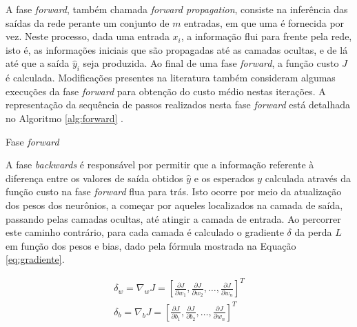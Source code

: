 A fase \emph{forward}, também chamada \emph{forward propagation}, consiste na inferência das saídas da rede perante um conjunto de $m$ entradas, em que uma é fornecida por vez. Neste processo, dada uma entrada $x_i$, a informação flui para frente  pela rede, isto é, as informações iniciais que são propagadas até as camadas ocultas, e de lá até que a saída $\hat{y}_i$ seja produzida. Ao final de uma fase \emph{forward}, a função custo $J$ é calculada. Modificações presentes na literatura também consideram algumas execuções da fase \emph{forward} para obtenção do custo médio nestas iterações. A representação da sequência de passos realizados nesta fase \emph{forward} está detalhada no Algoritmo \ref{alg:forward} \cite{haykin2009neural, goodfellow2016deep}.

\begin{algorithm}\label{alg:forward}
	\caption{Fase \emph{forward}}
\end{algorithm}

A fase \emph{backwards} é responsável por permitir que a informação referente à diferença entre os valores de saída obtidos $\hat{y}$ e os esperados $y$ calculada através da função custo na fase \emph{forward} flua para trás. Isto ocorre por meio da atualização dos pesos dos neurônios, a começar por aqueles localizados na camada de saída, passando pelas camadas ocultas, até atingir a camada de entrada. Ao percorrer este caminho contrário, para cada camada é calculado o gradiente $\delta$ da perda $L$ em função dos pesos e bias, dado pela fórmula mostrada na Equação \ref{eq:gradiente}.

\begin{gather}\label{eq:gradiente}
	\delta_w = \nabla_{w} J = \left[
							\frac{\partial J}{\partial w_1}, \frac{\partial J}{\partial w_2}, \ldots, \frac{\partial J}{\partial w_n}
						\right]^T\\
	\delta_b = \nabla_{b} J = \left[
							\frac{\partial J}{\partial b_1}, \frac{\partial J}{\partial b_2}, \ldots, \frac{\partial J}{\partial w_n}
						\right]^T
\end{gather}

